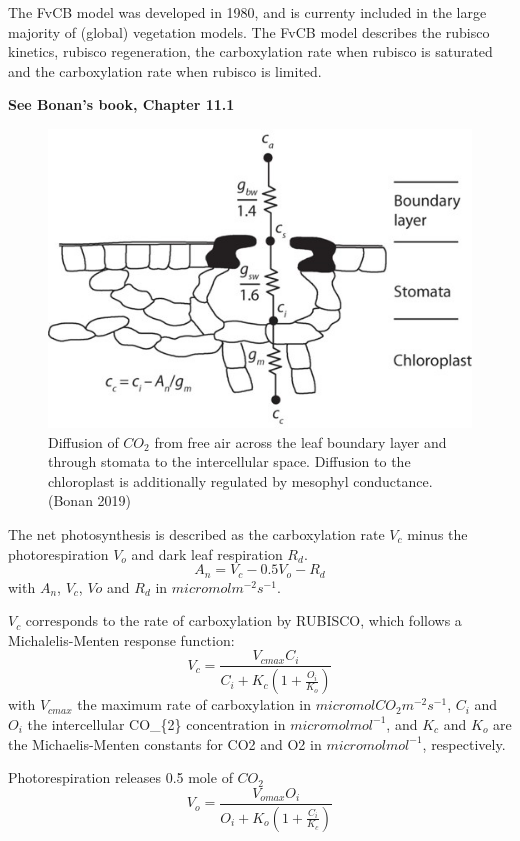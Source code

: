 \documentclass[12pt,oneside]{book}
\begin{document}
The FvCB model was developed in 1980, and is currenty included in the
large majority of (global) vegetation models. The FvCB model describes
the rubisco kinetics, rubisco regeneration, the carboxylation rate when
rubisco is saturated and the carboxylation rate when rubisco is limited.

\textbf{See Bonan's book, Chapter 11.1}

\begin{figure}

{\centering \includegraphics[width=0.8\linewidth]{figures/chap2/conductance} 

}

\caption{Diffusion of $CO_2$ from free air across the leaf boundary layer and through stomata to the intercellular space. Diffusion to the chloroplast is additionally regulated by mesophyl conductance. (Bonan 2019)}\label{fig:f27}
\end{figure}

The net photosynthesis is described as the carboxylation rate \(V_c\)
minus the photorespiration \(V_o\) and dark leaf respiration \(R_d\). \[
A_n=V_c-0.5V_o-R_d
\] with \({A_n}\), \({V_c}\), \({Vo}\) and \({R_d}\) in
\(micromol m^{-2} s^{-1}\).

\({V_c}\) corresponds to the rate of carboxylation by RUBISCO, which
follows a Michalelis-Menten response function: \[
V_c=\frac{V_{cmax}C_i}{C_i+K_c\left( 1+\frac{O_i}{K_o}\right)}
\] with \(V_{cmax}\) the maximum rate of carboxylation in
\(micromol CO_{2} m^{-2} s^{-1}\), \(C_i\) and \(O_i\) the intercellular
CO\_\{2\} concentration in \(micromol mol^{-1}\), and \(K_c\) and
\(K_o\) are the Michaelis-Menten constants for CO2 and O2 in
\(micromol mol^{-1}\), respectively.

Photorespiration releases 0.5 mole of \(CO_2\) \[
V_o=\frac{V_{omax}O_i}{O_i+K_o\left( 1+\frac{C_i}{K_c}\right)}
\]
\end{document}
